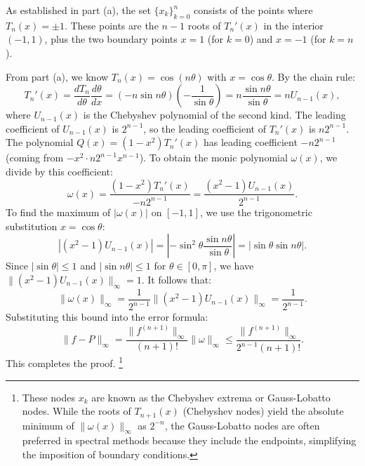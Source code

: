 \begin{solution}
\begin{enumerate}
As established in part (a), the set $\{x_k\}_{k=0}^n$ consists of the points where $T_n(x) = \pm 1$. These points are the $n-1$ roots of $T_n'(x)$ in the interior $(-1, 1)$, plus the two boundary points $x=1$ (for $k=0$) and $x=-1$ (for $k=n$). 

From part (a), we know $T_n(x) = \cos(n\theta)$ with $x = \cos \theta$. By the chain rule:
\[ T_n'(x) = \frac{d T_n}{d \theta} \frac{d \theta}{d x} = (-n \sin n\theta) \left( -\frac{1}{\sin \theta} \right) = n \frac{\sin n\theta}{\sin \theta} = n U_{n-1}(x), \]
where $U_{n-1}(x)$ is the Chebyshev polynomial of the second kind. The leading coefficient of $U_{n-1}(x)$ is $2^{n-1}$, so the leading coefficient of $T_n'(x)$ is $n 2^{n-1}$. The polynomial $Q(x) = (1-x^2)T_n'(x)$ has leading coefficient $-n 2^{n-1}$ (coming from $-x^2 \cdot n 2^{n-1} x^{n-1}$). To obtain the monic polynomial $\omega(x)$, we divide by this coefficient:
\[
\omega(x) = \frac{(1-x^2)T_n'(x)}{-n 2^{n-1}} = \frac{(x^2-1) U_{n-1}(x)}{2^{n-1}}.
\]
To find the maximum of $|\omega(x)|$ on $[-1, 1]$, we use the trigonometric substitution $x = \cos \theta$:
\[
|(x^2-1) U_{n-1}(x)| = \left| -\sin^2 \theta \frac{\sin n\theta}{\sin \theta} \right| = |\sin \theta \sin n\theta|.
\]
Since $|\sin \theta| \leq 1$ and $|\sin n\theta| \leq 1$ for $\theta \in [0, \pi]$, we have $\|(x^2-1) U_{n-1}(x)\|_{\infty} = 1$. It follows that:
\[
\|\omega(x)\|_{\infty} = \frac{1}{2^{n-1}} \|(x^2-1) U_{n-1}(x)\|_{\infty} = \frac{1}{2^{n-1}}.
\]
Substituting this bound into the error formula:
\[
\|f - P\|_{\infty} = \frac{\|f^{(n+1)}\|_{\infty}}{(n+1)!} \|\omega\|_{\infty} \leq \frac{\|f^{(n+1)}\|_{\infty}}{2^{n-1}(n+1)!}.
\]
This completes the proof. \footnote{These nodes $x_k$ are known as the Chebyshev extrema or Gauss-Lobatto nodes. While the roots of $T_{n+1}(x)$ (Chebyshev nodes) yield the absolute minimum of $\|\omega(x)\|_{\infty}$ as $2^{-n}$, the Gauss-Lobatto nodes are often preferred in spectral methods because they include the endpoints, simplifying the imposition of boundary conditions.}
\end{enumerate}
\end{solution}

